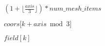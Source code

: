 \documentclass{article}
\begin{document}
$ ( 1 + \lfloor \frac{\mathit{axis}}{3} \rfloor ) * \mathit{num\_mesh\_items} $
\pagebreak

$ \mathit{coors} \lbrack k+ \mathit{axis} \bmod 3 \rbrack $
\pagebreak

$ field[k] $
\pagebreak
\end{document}
